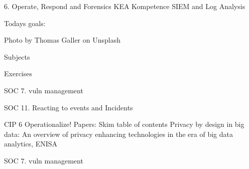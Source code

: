 \documentclass[Screen16to9,17pt]{foils}
\begin{document}
\mytitlepage
{6. Operate, Respond and Forensics}
{KEA Kompetence SIEM and Log Analysis}




Todays goals:
\begin{list2}
  \item\end{list2}

  Photo by Thomas Galler on Unsplash


\begin{list1}
\item Subjects
\begin{list2}
\item
\end{list2}
\item Exercises
\begin{list2}
\item
\end{list2}
\end{list1}


\begin{list1}
\item SOC 7. vuln management
\item SOC 11. Reacting to events and Incidents
\item CIP 6 Operationalize!
 Papers: Skim table of contents Privacy by design in big data: An overview of privacy enhancing technologies in the era of big data analytics, ENISA
\item
\end{list1}




\begin{quote}

\end{quote}

\begin{list1}
\item SOC 7. vuln management
\begin{list2}
\item
\end{list2}
\end{list1}


\end{document}
